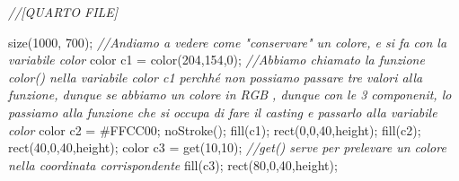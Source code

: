 \documentclass[
]{article}
\newenvironment{Shaded}{}{}
\newcommand{\CommentTok}[1]{\textcolor[rgb]{0.38,0.63,0.69}{\textit{#1}}}
\newcommand{\DecValTok}[1]{\textcolor[rgb]{0.25,0.63,0.44}{#1}}
\newcommand{\FunctionTok}[1]{\textcolor[rgb]{0.02,0.16,0.49}{#1}}
\newcommand{\NormalTok}[1]{#1}
\newcommand{\OperatorTok}[1]{\textcolor[rgb]{0.40,0.40,0.40}{#1}}
\begin{document}
\begin{Shaded}
\begin{Highlighting}[]
\CommentTok{//[QUARTO FILE]}

\FunctionTok{size}\OperatorTok{(}\DecValTok{1000}\OperatorTok{,} \DecValTok{700}\OperatorTok{);}
\CommentTok{//Andiamo a vedere come "conservare" un colore, e si fa con la variabile \textquotesingle{}color\textquotesingle{}}
\NormalTok{color c1 }\OperatorTok{=} \FunctionTok{color}\OperatorTok{(}\DecValTok{204}\OperatorTok{,}\DecValTok{154}\OperatorTok{,}\DecValTok{0}\OperatorTok{);} \CommentTok{//Abbiamo chiamato la funzione \textquotesingle{}color()\textquotesingle{} nella variabile \textquotesingle{}color c1\textquotesingle{} perchhé non possiamo passare tre valori alla funzione, dunque se abbiamo un colore in RGB , dunque con le 3 componenit, lo passiamo alla funzione che si occupa di fare il casting e passarlo alla variabile \textquotesingle{}color\textquotesingle{}}
\NormalTok{color c2 }\OperatorTok{=}\NormalTok{ \#FFCC00}\OperatorTok{;}
\FunctionTok{noStroke}\OperatorTok{();}
\FunctionTok{fill}\OperatorTok{(}\NormalTok{c1}\OperatorTok{);}
\FunctionTok{rect}\OperatorTok{(}\DecValTok{0}\OperatorTok{,}\DecValTok{0}\OperatorTok{,}\DecValTok{40}\OperatorTok{,}\NormalTok{height}\OperatorTok{);}
\FunctionTok{fill}\OperatorTok{(}\NormalTok{c2}\OperatorTok{);}
\FunctionTok{rect}\OperatorTok{(}\DecValTok{40}\OperatorTok{,}\DecValTok{0}\OperatorTok{,}\DecValTok{40}\OperatorTok{,}\NormalTok{height}\OperatorTok{);}
\NormalTok{color c3 }\OperatorTok{=} \FunctionTok{get}\OperatorTok{(}\DecValTok{10}\OperatorTok{,}\DecValTok{10}\OperatorTok{);} \CommentTok{//\textquotesingle{}get()\textquotesingle{} serve per prelevare un colore nella coordinata corrispondente}
\FunctionTok{fill}\OperatorTok{(}\NormalTok{c3}\OperatorTok{);}
\FunctionTok{rect}\OperatorTok{(}\DecValTok{80}\OperatorTok{,}\DecValTok{0}\OperatorTok{,}\DecValTok{40}\OperatorTok{,}\NormalTok{height}\OperatorTok{);}
\end{Highlighting}
\end{Shaded}
\end{document}
